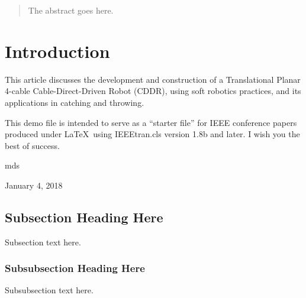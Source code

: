 \documentclass[conference]{IEEEtran}
\begin{document}




\maketitle

\begin{abstract}
The abstract goes here.
\end{abstract}





%
\IEEEpeerreviewmaketitle



\section{Introduction}
This article discusses the development and construction of a Translational Planar 4-cable Cable-Direct-Driven Robot (CDDR), using soft robotics practices, and its applications in catching and throwing. 


This demo file is intended to serve as a ``starter file''
for IEEE conference papers produced under \LaTeX\ using
IEEEtran.cls version 1.8b and later.
I wish you the best of success.

\hfill mds
 
\hfill January 4, 2018

\subsection{Subsection Heading Here}
Subsection text here.


\subsubsection{Subsubsection Heading Here}
Subsubsection text here.
\end{document}

